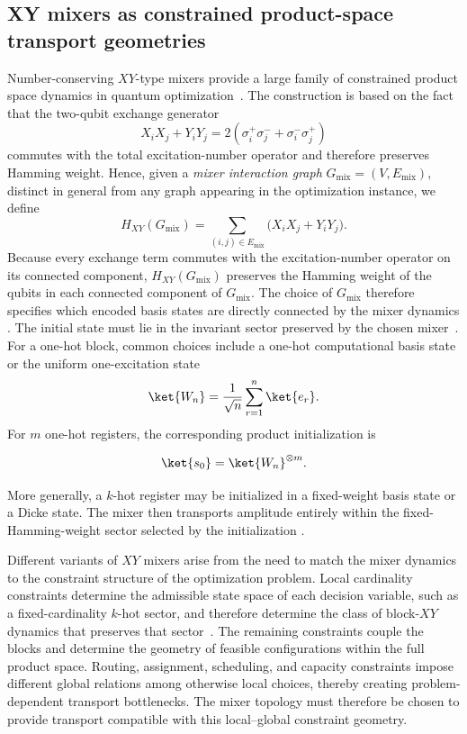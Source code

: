 \documentclass[a4paper,onecolumn,11pt,unpublished]{quantumarticle}
\theoremstyle{remark}
\newcommand{\sh}[1]{{\color{teal}#1}}
\begin{document}


\subsection{XY mixers as constrained product-space transport geometries}
\label{subsec:xy-mixers-product spaces}


Number-conserving \(XY\)-type mixers provide a large family of constrained product space dynamics in quantum optimization~\cite{Hadfield2019AOA,Wang2020XYMixers}. The construction is based on the fact that the two-qubit exchange generator
\[
X_iX_j+Y_iY_j
=
2(\sigma_i^+\sigma_j^-+\sigma_i^-\sigma_j^+)
\]
commutes with the total excitation-number operator and therefore preserves Hamming weight. Hence, given a \emph{mixer interaction graph} \(G_{\mathrm{mix}}=(V,E_{\mathrm{mix}})\), distinct in general from any graph appearing in the optimization instance, we define \[ H_{XY}(G_{\mathrm{mix}}) = \sum_{(i,j)\in E_{\mathrm{mix}}} \bigl(X_iX_j+Y_iY_j\bigr). \] Because every exchange term commutes with the excitation-number operator on its connected component, \(H_{XY}(G_{\mathrm{mix}})\) preserves the Hamming weight of the qubits in each connected component of \(G_{\mathrm{mix}}\). The choice of \(G_{\mathrm{mix}}\) therefore specifies which encoded basis states are directly connected by the mixer dynamics \cite{Hadfield2019AOA,Wang2020XYMixers,KordonowyLeipold2026XYLie,leipold2026imposing}. The initial state must lie in the invariant sector preserved by the chosen mixer~\cite{Hadfield2019AOA,tsvelikhovskiy2024symmetries}. For a one-hot block, common choices include a one-hot computational basis state or the uniform one-excitation state
\[ \ket{W_n} = \frac{1}{\sqrt n}\sum_{r=1}^{n}\ket{e_r}. \] For \(m\) one-hot registers, the corresponding product initialization is 

\[ \ket{s_0} = \ket{W_n}^{\otimes m}.
\] 

More generally, a \(k\)-hot register may be initialized in a fixed-weight basis state or a Dicke state. The mixer then transports amplitude entirely within the fixed-Hamming-weight sector selected by the initialization \cite{Hadfield2019AOA,B_rtschi_2019,onahce}.




Different variants of \(XY\) mixers arise from the need to match the mixer dynamics to the constraint structure of the optimization problem. Local cardinality constraints determine the admissible state space of each decision variable, such as a fixed-cardinality \(k\)-hot sector, and therefore determine the class of block-\(XY\) dynamics that preserves that sector~\cite{Hadfield2019AOA}. The remaining constraints couple the blocks and determine the geometry of feasible configurations within the full product space. Routing, assignment, scheduling, and capacity constraints impose different global relations among otherwise local choices, thereby creating problem-dependent transport bottlenecks. The mixer topology must therefore be chosen to provide transport compatible with this local--global constraint geometry.
\end{document}
